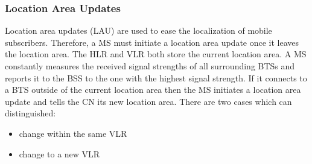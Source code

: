 \documentclass[master,english]{hgbthesis}
\begin{document}
\subsubsection{Location Area Updates}
Location area updates (LAU) are used to ease the localization of mobile subscribers. Therefore, a MS must initiate a location area update once it leaves the location area. The HLR and VLR both store the current location area. A MS constantly measures the received signal strengths of all surrounding BTSs and reports it to the BSS to the one with the highest signal strength. If it connects to a BTS outside of the current location area then the MS initiates a location area update and tells the CN its new location area.
There are two cases which can distinguished:
\begin{itemize}
	\item change within the same VLR
	\item change to a new VLR
\end{itemize}
\end{document}
